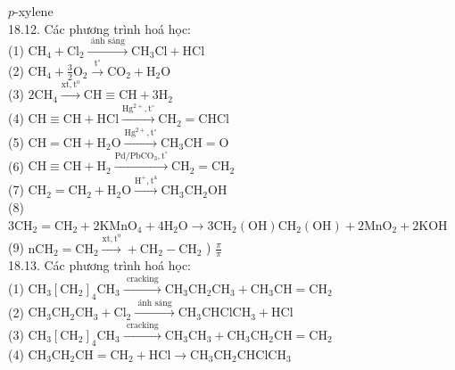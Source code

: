 \documentclass[10pt]{article}
\begin{document}
$p$-xylene\\
18.12. Các phương trình hoá học:\\
(1) $\mathrm{CH}_{4}+\mathrm{Cl}_{2} \xrightarrow{\text { ánh sáng }} \mathrm{CH}_{3} \mathrm{Cl}+\mathrm{HCl}$\\
(2) $\mathrm{CH}_{4}+\frac{3}{2} \mathrm{O}_{2} \xrightarrow{\mathrm{t}^{\circ}} \mathrm{CO}_{2}+\mathrm{H}_{2} \mathrm{O}$\\
(3) $2 \mathrm{CH}_{4} \xrightarrow{\mathrm{xt}, \mathrm{t}^{\mathrm{o}}} \mathrm{CH} \equiv \mathrm{CH}+3 \mathrm{H}_{2}$\\
(4) $\mathrm{CH} \equiv \mathrm{CH}+\mathrm{HCl} \xrightarrow{\mathrm{Hg}^{2+}, \mathrm{t}^{\circ}} \mathrm{CH}_{2}=\mathrm{CHCl}$\\
(5) $\mathrm{CH}=\mathrm{CH}+\mathrm{H}_{2} \mathrm{O} \xrightarrow{\mathrm{Hg}^{2+}, \mathrm{t}^{\circ}} \mathrm{CH}_{3} \mathrm{CH}=\mathrm{O}$\\
(6) $\mathrm{CH} \equiv \mathrm{CH}+\mathrm{H}_{2} \xrightarrow{\mathrm{Pd} / \mathrm{PbCO}_{3}, \mathrm{t}^{\circ}} \mathrm{CH}_{2}=\mathrm{CH}_{2}$\\
(7) $\mathrm{CH}_{2}=\mathrm{CH}_{2}+\mathrm{H}_{2} \mathrm{O} \xrightarrow{\mathrm{H}^{+}, \mathrm{t}^{\mathrm{a}}} \mathrm{CH}_{3} \mathrm{CH}_{2} \mathrm{OH}$\\
(8) $3 \mathrm{CH}_{2}=\mathrm{CH}_{2}+2 \mathrm{KMnO}_{4}+4 \mathrm{H}_{2} \mathrm{O} \longrightarrow 3 \mathrm{CH}_{2}(\mathrm{OH}) \mathrm{CH}_{2}(\mathrm{OH})+2 \mathrm{MnO}_{2}+2 \mathrm{KOH}$\\
(9) $\mathrm{nCH}_{2}=\mathrm{CH}_{2} \xrightarrow{\mathrm{xt}, \mathrm{t}^{\mathrm{o}}}+\mathrm{CH}_{2}-\mathrm{CH}_{2}$ ) $\frac{\pi}{\pi}$\\
18.13. Các phương trình hoá học:\\
(1) $\mathrm{CH}_{3}\left[\mathrm{CH}_{2}\right]_{4} \mathrm{CH}_{3} \xrightarrow{\text { cracking }} \mathrm{CH}_{3} \mathrm{CH}_{2} \mathrm{CH}_{3}+\mathrm{CH}_{3} \mathrm{CH}=\mathrm{CH}_{2}$\\
(2) $\mathrm{CH}_{3} \mathrm{CH}_{2} \mathrm{CH}_{3}+\mathrm{Cl}_{2} \xrightarrow{\text { ánh sáng }} \mathrm{CH}_{3} \mathrm{CHClCH}_{3}+\mathrm{HCl}$\\
(3) $\mathrm{CH}_{3}\left[\mathrm{CH}_{2}\right]_{4} \mathrm{CH}_{3} \xrightarrow{\text { cracking }} \mathrm{CH}_{3} \mathrm{CH}_{3}+\mathrm{CH}_{3} \mathrm{CH}_{2} \mathrm{CH}=\mathrm{CH}_{2}$\\
(4) $\mathrm{CH}_{3} \mathrm{CH}_{2} \mathrm{CH}=\mathrm{CH}_{2}+\mathrm{HCl} \longrightarrow \mathrm{CH}_{3} \mathrm{CH}_{2} \mathrm{CHClCH}_{3}$\\
\end{document}
